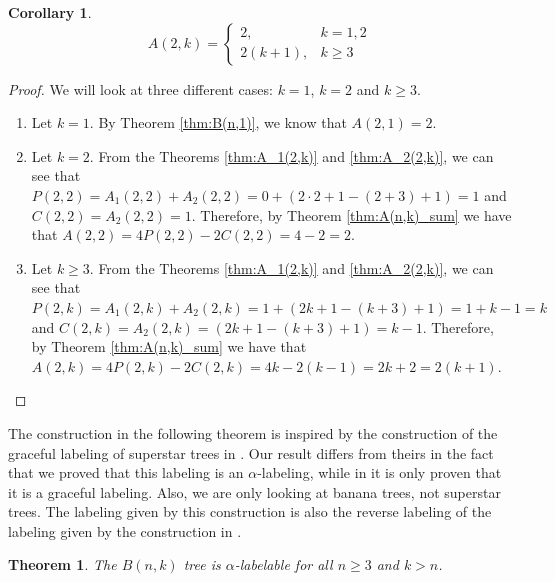 \documentclass[10pt]{article}
\newtheorem{theorem}{Theorem}
\newtheorem{corollary}{Corollary}[theorem]
\theoremstyle{definition}
\begin{document}
\begin{corollary}
  $$
  A(2, k) =
  \begin{cases}
    2, & k = 1, 2\\
    2(k + 1),& k \ge 3
  \end{cases}
  $$
\end{corollary}

\begin{proof}
  We will look at three different cases: $k = 1$, $k = 2$ and $k \ge 3$.

  \begin{enumerate}
    \item Let $k = 1$. By Theorem \ref{thm:B(n,1)}, we know that $A(2, 1) = 2$.

    \item Let $k = 2$. From the Theorems \ref{thm:A_1(2,k)} and \ref{thm:A_2(2,k)}, we can see that $P(2, 2) = A_1(2,2) + A_2(2,2) = 0 + (2 \cdot 2 + 1 - (2 + 3) + 1) = 1$ and $C(2, 2) = A_2(2,2) = 1$. Therefore, by Theorem \ref{thm:A(n,k)_sum} we have that $A(2,2) = 4P(2,2) - 2C(2,2) = 4 - 2 = 2$.

    \item Let $k \ge 3$. From the Theorems \ref{thm:A_1(2,k)} and \ref{thm:A_2(2,k)}, we can see that $P(2, k) = A_1(2,k) + A_2(2,k) = 1 + (2k + 1 - (k + 3) + 1) = 1 + k - 1 = k$ and $C(2, k) = A_2(2,k) = (2k + 1 - (k + 3) + 1) = k - 1$. Therefore, by Theorem \ref{thm:A(n,k)_sum} we have that $A(2,k) = 4P(2,k) - 2C(2,k) = 4k - 2(k - 1) = 2k + 2 = 2(k + 1)$.
  \end{enumerate}
\end{proof}

The construction in the following theorem is inspired by the construction of the graceful labeling of superstar trees in \cite{MMK14}. Our result differs from theirs in the fact that we proved that this labeling is an $\alpha$-labeling, while in \cite{MMK14} it is only proven that it is a graceful labeling. Also, we are only looking at banana trees, not superstar trees. The labeling given by this construction is also the reverse labeling of the labeling given by the construction in \cite{SSS23}.

\begin{theorem}
  The $B(n, k)$ tree is $\alpha$-labelable for all $n \geq 3$ and $k > n$.
\end{theorem}
\end{document}
